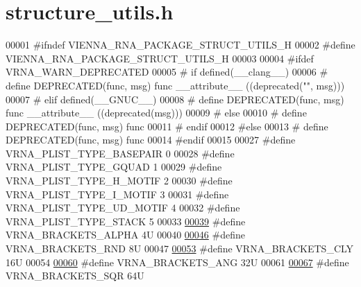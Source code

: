 \hypertarget{structure__utils_8h_source}{}\section{structure\+\_\+utils.\+h}
\label{structure__utils_8h_source}

\begin{DoxyCode}
00001 \textcolor{preprocessor}{#ifndef VIENNA\_RNA\_PACKAGE\_STRUCT\_UTILS\_H}
00002 \textcolor{preprocessor}{#define VIENNA\_RNA\_PACKAGE\_STRUCT\_UTILS\_H}
00003 
00004 \textcolor{preprocessor}{#ifdef VRNA\_WARN\_DEPRECATED}
00005 \textcolor{preprocessor}{# if defined(\_\_clang\_\_)}
00006 \textcolor{preprocessor}{#  define DEPRECATED(func, msg) func \_\_attribute\_\_ ((deprecated("", msg)))}
00007 \textcolor{preprocessor}{# elif defined(\_\_GNUC\_\_)}
00008 \textcolor{preprocessor}{#  define DEPRECATED(func, msg) func \_\_attribute\_\_ ((deprecated(msg)))}
00009 \textcolor{preprocessor}{# else}
00010 \textcolor{preprocessor}{#  define DEPRECATED(func, msg) func}
00011 \textcolor{preprocessor}{# endif}
00012 \textcolor{preprocessor}{#else}
00013 \textcolor{preprocessor}{# define DEPRECATED(func, msg) func}
00014 \textcolor{preprocessor}{#endif}
00015 
00027 \textcolor{preprocessor}{#define VRNA\_PLIST\_TYPE\_BASEPAIR      0}
00028 \textcolor{preprocessor}{#define VRNA\_PLIST\_TYPE\_GQUAD         1}
00029 \textcolor{preprocessor}{#define VRNA\_PLIST\_TYPE\_H\_MOTIF       2}
00030 \textcolor{preprocessor}{#define VRNA\_PLIST\_TYPE\_I\_MOTIF       3}
00031 \textcolor{preprocessor}{#define VRNA\_PLIST\_TYPE\_UD\_MOTIF      4}
00032 \textcolor{preprocessor}{#define VRNA\_PLIST\_TYPE\_STACK         5}
00033 
\hyperlink{group__struct__utils_ga7e3f630af8d69bb0e917145aacf2f96d}{00039} \textcolor{preprocessor}{#define VRNA\_BRACKETS\_ALPHA    4U}
00040 
\hyperlink{group__struct__utils_gac92d5fa7c6625bce2670ece510a24fbd}{00046} \textcolor{preprocessor}{#define VRNA\_BRACKETS\_RND      8U}
00047 
\hyperlink{group__struct__utils_gaf41be40e79cb756c4e0bb8edb4d803d2}{00053} \textcolor{preprocessor}{#define VRNA\_BRACKETS\_CLY      16U}
00054 
\hyperlink{group__struct__utils_ga863e03f7f73f10fc9bbcbefbdda4bec8}{00060} \textcolor{preprocessor}{#define VRNA\_BRACKETS\_ANG      32U}
00061 
\hyperlink{group__struct__utils_ga60525d61d7496eeea490a37f3d6bf757}{00067} \textcolor{preprocessor}{#define VRNA\_BRACKETS\_SQR      64U}

\end{DoxyCode}
